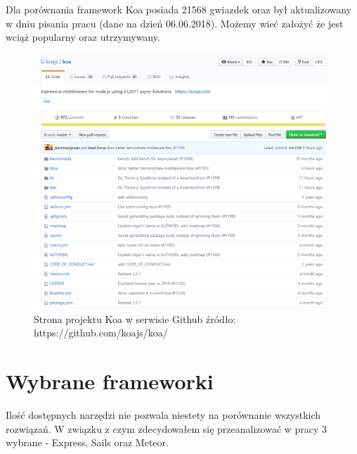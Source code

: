\documentclass[12pt]{report}
\begin{document}
    Dla porównania framework Koa posiada 21568 gwiazdek oraz był aktualizowany w dniu pisania pracu (dane na dzień 06.06.2018).
    Możemy wieć założyć że jest wciąż popularny oraz utrzymywany.
    \begin{figure}[!hb]
      \centering
      \includegraphics[width=\textwidth,height=\textheight,keepaspectratio]{koa.png} 
      \caption{Strona projektu Koa w serwisie Github \newline źródło: https://github.com/koajs/koa/}
    \end{figure}

  \section{Wybrane frameworki}
    Ilość dostępnych narzędzi nie pozwala niestety na porównanie wszystkich rozwiązań.
    W związku z czym zdecydowałem się przeanalizować w pracy 3 wybrane - Express, Sails oraz Meteor.
\end{document}
